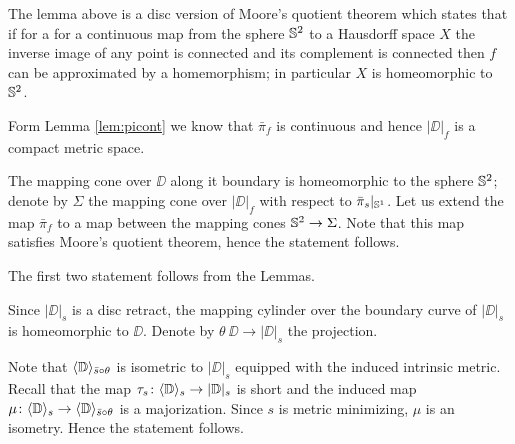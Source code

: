 The lemma above is a disc version of Moore's quotient theorem \cite{moore}
which states that if for a for a continuous map from the sphere $\mathbb{S}^2$ to a Hausdorff space $X$
the inverse image of any point is connected and its complement is connected then $f$ can be approximated by a homemorphism; in particular $X$ is homeomorphic to $\mathbb{S}^2$.

Form Lemma \ref{lem:picont} we know that $\bar\pi_f$ is continuous and hence $|\DD|_f$
is a compact metric space. 


The mapping cone over $\DD$ along it boundary is homeomorphic to the sphere $\mathbb{S}^2$;
denote by $\Sigma$ the mapping cone over $|\DD|_f$ with respect to $\bar\pi_s|_{\mathbb{S}^1}$.
Let us extend the map $\bar\pi_f$ to a map between the mapping cones $\mathbb{S}^2\to\Sigma$.
Note that this map satisfies Moore's quotient theorem, hence the statement follows.
\qeds

The first two statement follows from the Lemmas.

Since $|\DD|_s$ is a disc retract, the mapping cylinder over the boundary curve of $|\DD|_s$ is homeomorphic to $\DD$.
Denote by $\theta\:\DD\to |\DD|_s$ the projection.

Note that $\langle\mathbb{D}\rangle_{\bar s\circ\theta}$ is isometric to $|\DD|_s$ equipped with the induced intrinsic metric.
Recall that the map $\tau_s\colon\langle\mathbb{D}\rangle_s\to|\mathbb{D}|_s$ is short and the induced map $\mu\colon\langle\mathbb{D}\rangle_s\to\langle\mathbb{D}\rangle_{\bar s\circ\theta}$ is a majorization.
Since $s$ is metric minimizing, $\mu$ is an isometry.
Hence the statement follows.
\qeds
